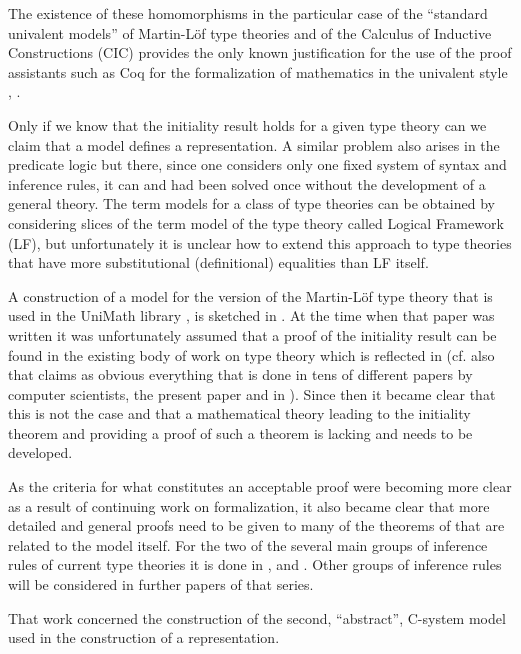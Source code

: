 \documentclass[12pt]{amsart}
\begin{document}
The existence of these homomorphisms in the particular case of the ``standard univalent models'' of  Martin-L\"{o}f type theories and of the Calculus of Inductive Constructions (CIC) provides the only known justification for the use of the proof assistants such as Coq for the formalization of mathematics in the univalent style \cite{UniMath2015}, \cite{UniMath}. 

Only if we know that the initiality result holds for a given type theory can we claim that a model defines a representation. A similar problem also arises in the predicate logic but there, since one considers only one fixed system of syntax and inference rules, it can and had been solved once without the development of a general theory. The term models for a class of type theories can be obtained by considering slices of the term model of the type theory called Logical Framework (LF), but unfortunately it is unclear how to extend this approach to type theories that have more substitutional (definitional) equalities than LF itself.

A construction of a model for the version of the Martin-L\"{o}f type theory that is used in the UniMath library \cite{UniMath}, \cite{UniMath2015} is sketched in \cite{KLV1}. At the time when that paper was written it was unfortunately assumed that a proof of the initiality result can be found in the existing body of work on type theory which is reflected  in \cite[Theorem 1.2.9]{KLV1} (cf. also \cite[Example 1.2.3]{KLV1} that claims as obvious everything that is done in tens of different papers by computer scientists, the present paper and in \cite{Csubsystems}).  Since then it became clear that this is not the case and that a mathematical theory leading to the initiality theorem and providing a proof of such a theorem is lacking and needs to be developed. 

As the criteria for what constitutes an acceptable proof were becoming more clear as a result of continuing work on formalization, it also became clear that more detailed and general proofs need to be given to many of the theorems of \cite{KLV1} that are related to the model itself. For the two of the several main groups of inference rules of current type theories it is done in \cite{fromunivwithPiI}, \cite{fromunivwithPiII}  and \cite{fromunivwithpaths}. Other groups of inference rules will be considered in further papers of that series. 

That work concerned the construction of the second, ``abstract'', C-system model used in the construction of a representation.
\end{document}
